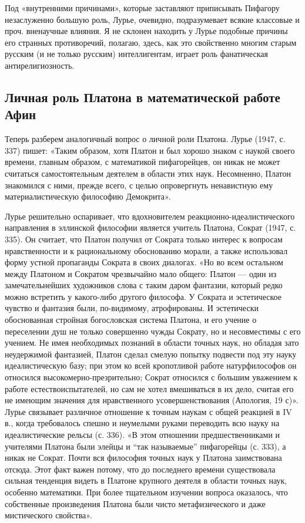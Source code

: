 Под «внутренними  причинами», которые заставляют  приписывать Пифагору
незаслуженно  большую  роль,  Лурье,  очевидно,  подразумевает  всякие
классовые и  проч. вненаучные влияния.  Я не склонен находить  у Лурье
подобные причины  его странных  противоречий, полагаю, здесь,  как это
свойственно многим старым русским (и не только русским) интеллигентам,
играет роль фанатическая антирелигиозность.

\subsection{Личная роль Платона в математической работе Афин}

Теперь разберем аналогичный вопрос о личной роли Платона. Лурье (1947,
с.  337) пишет:  «Таким образом,  хотя Платон  и был  хорошо знаком  с
наукой своего времени, главным образом, с математикой пифагорейцев, он
никак  не  может считаться  самостоятельным  деятелем  в области  этих
наук.  Несомненно, Платон  знакомился с  ними, прежде  всего, с  целью
опровергнуть ненавистную ему материалистическую философию Демокрита».

Лурье       решительно       оспаривает,       что       вдохновителем
реакционно-идеалистического направления в эллинской философии является
учитель Платона, Сократ (1947, с. 335). Он считает, что Платон получил
от Сократа только интерес к  вопросам нравственности и к рациональному
обоснованию  морали,  а  также  использовал  форму  устной  пропаганды
Сократа  в своих  диалогах. «Но  во  всем остальном  между Платоном  и
Сократом чрезвычайно мало общего:  Платон --- один из замечательнейших
художников слова с таким даром фантазии, который редко можно встретить
у какого-либо  другого философа.  У Сократа  и эстетическое  чувство и
фантазия были,  по-видимому, атрофированы. И  эстетически обоснованная
стройная богословская система Платона, и  его учение о переселении душ
не только совершенно  чужды Сократу, но и несовместимы  с его учением.
Не  имея  необходимых  познаний  в области  точных  наук,  но  обладая
зато  неудержимой фантазией,  Платон  сделал  смелую попытку  подвести
под  эту науку  идеалистическую  базу; при  этом  ко всей  кропотливой
работе  натурфилософов он  относился высокомерно-презрительно;  Сократ
относился с большим уважением к  работе естествоиспытателей, но сам не
хотел  вмешиваться в  их  дело,  считая его  не  имеющим значения  для
нравственного  усовершенствования (Апология,  19 с)».  Лурье связывает
различное  отношение  к  точным  наукам  с общей  реакцией  в  IV  в.,
когда требовалось  спешно и неумелыми  руками переводить всю  науку на
идеалистические рельсы (с. 336). «В этом отношении предшественниками и
учителями  Платона были  элейцы и  ``так называемые''  пифагорейцы (с.
333), а  никак не Сократ.  Почти вся  философия точных наук  у Платона
заимствована отсюда. Этот факт важен потому, что до последнего времени
существовала  сильная  тенденция  видеть в  Платоне  крупного  деятеля
в  области  точных наук,  особенно  математики.  При более  тщательном
изучении вопроса оказалось, что  собственные произведения Платона были
чисто метафизического и даже мистического свойства».

